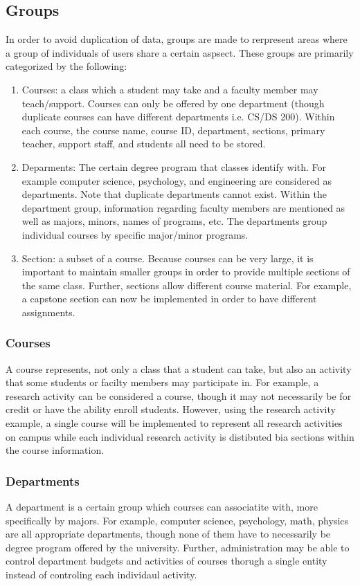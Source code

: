 \documentclass{article}
\begin{document}
  \subsection{Groups}\label{sec:Requirements:Groups}
    In order to avoid duplication of data, groups are made to rerpresent areas where a group of individuals of users share a certain aspsect.  These groups are primarily categorized by the following:
    \begin{enumerate}
      \item Courses: a class which a student may take and a faculty member may teach/support.  Courses can only be offered by one department (though duplicate courses can have different departments i.e. CS/DS 200).  Within each course, the course name, course ID, department, sections, primary teacher, support staff, and students all need to be stored.
      \item Deparments: The certain degree program that classes identify with.  For example computer science, psychology, and engineering are considered as departments.  Note that duplicate departments cannot exist.  Within the department group, information regarding faculty members are mentioned as well as majors, minors, names of programs, etc.  The departments group individual courses by specific major/minor programs.
      \item Section: a subset of a course.  Because courses can be very large, it is important to maintain smaller groups in order to provide multiple sections of the same class.  Further, sections allow different course material.  For example, a capstone section can now be implemented in order to have different assignments.
    \end{enumerate}

  \subsubsection{Courses}\label{sec:Requirements:Groups:Courses}
    A course represents, not only a class that a student can take, but also an activity that some students or facilty members may participate in.  For example, a research activity can be considered a course, though it may not necessarily be for credit or have the ability enroll students.  However, using the research activity example, a single course will be implemented to represent all research activities on campus while each individual research activity is distibuted bia sections within the course information.

  \subsubsection{Departments}\label{sec:Requirements:Groups:Departments}
    A department is a certain group which courses can associatite with, more specifically by majors.  For example, computer science, psychology, math, physics are all appropriate departments, though none of them have to necessarily be degree program offered by the university.  Further, administration may be able to control department budgets and activities of courses thorugh a single entity instead of controling each individaul activity.
\end{document}
